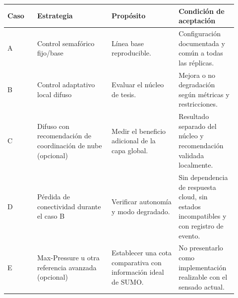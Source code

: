 \documentclass[12pt,a4paper,oneside]{report}
\begin{document}
\begin{longtable}{@{}p{0.12\linewidth}p{0.30\linewidth}p{0.27\linewidth}p{0.23\linewidth}@{}}
\toprule
\textbf{Caso} & \textbf{Estrategia} & \textbf{Propósito} & \textbf{Condición de aceptación}\\
\midrule
\endhead
A & Control semafórico fijo/base & Línea base reproducible. & Configuración documentada y común a todas las réplicas.\\
B & Control adaptativo local difuso & Evaluar el núcleo de tesis. & Mejora o no degradación según métricas y restricciones.\\
C & Difuso con recomendación de coordinación de nube (opcional) & Medir el beneficio adicional de la capa global. & Resultado separado del núcleo y recomendación validada localmente.\\
D & Pérdida de conectividad durante el caso B & Verificar autonomía y modo degradado. & Sin dependencia de respuesta cloud, sin estados incompatibles y con registro de evento.\\
E & Max-Pressure u otra referencia avanzada (opcional) & Establecer una cota comparativa con información ideal de SUMO. & No presentarlo como implementación realizable con el sensado actual.\\
\bottomrule
\end{longtable}

\begin{center}
\label{fig:flujo-validacion-v2}
\end{center}
\end{document}
